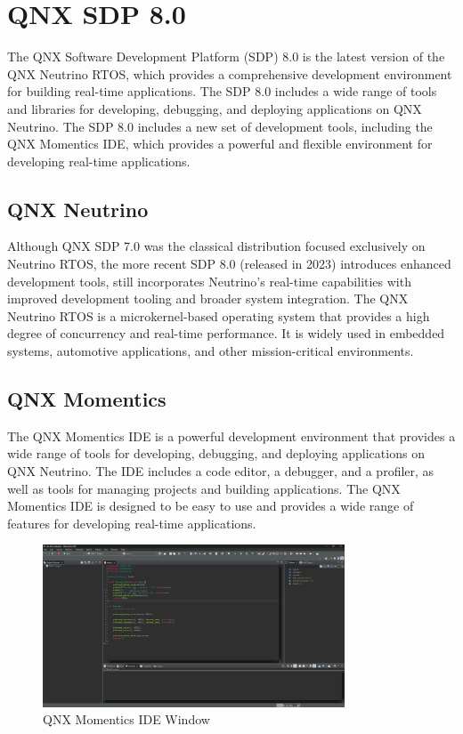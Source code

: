 \documentclass{article}
\begin{document}
\section{QNX SDP 8.0}
\label{sec:qnx-sdp}
The QNX Software Development Platform (SDP) 8.0 is the latest version of the QNX Neutrino RTOS, which provides a comprehensive development environment for building real-time applications.
The SDP 8.0 includes a wide range of tools and libraries for developing, debugging, and deploying applications on QNX Neutrino.
The SDP 8.0 includes a new set of development tools, including the QNX Momentics IDE, which provides a powerful and flexible environment for developing real-time applications.


\subsection{QNX Neutrino}
\label{sec:qnx-neutrino}
Although QNX SDP 7.0 was the classical distribution focused exclusively on Neutrino RTOS, the more recent SDP 8.0 (released in 2023) introduces enhanced development tools,
still incorporates Neutrino's real-time capabilities with improved development tooling and broader system integration.
The QNX Neutrino RTOS is a microkernel-based operating system that provides a high degree of concurrency and real-time performance.
It is widely used in embedded systems, automotive applications, and other mission-critical environments.

\subsection{QNX Momentics}
\label{sec:qnx-momentics}
The QNX Momentics IDE is a powerful development environment that provides a wide range of tools for developing, debugging, and deploying applications on QNX Neutrino.
The IDE includes a code editor, a debugger, and a profiler, as well as tools for managing projects and building applications.
The QNX Momentics IDE is designed to be easy to use and provides a wide range of features for developing real-time applications.
 
\begin{figure}[!htbp]
    \centering
    \includegraphics[width=0.8\textwidth]{graph2.png} %
    \caption{QNX Momentics IDE Window \cite{qnx_m} }
    \label{fig:qnx-momentics window}
\end{figure}
\FloatBarrier
\end{document}
